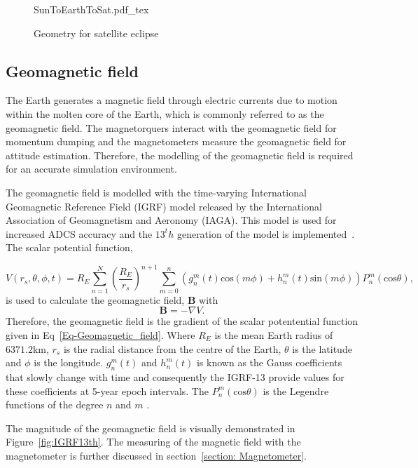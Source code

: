 \begin{figure}[!htb]
	\centering
	\def\svgwidth{12cm}
	{SunToEarthToSat.pdf_tex}
	\caption{Geometry for satellite eclipse}
	\label{fig:SunToEarthToSat}
\end{figure}


\subsection{Geomagnetic field}

The Earth generates a magnetic field through electric currents due to motion within the molten core of the Earth, which is commonly referred to as the geomagnetic field. The magnetorquers interact with the geomagnetic field for momentum dumping and the magnetometers measure the geomagnetic field for attitude estimation. Therefore, the modelling of the geomagnetic field is required for an accurate simulation environment.

The geomagnetic field is modelled with the time-varying International Geomagnetic Reference Field (IGRF) model released by the International Association of Geomagnetism and Aeronomy (IAGA). This model is used for increased ADCS accuracy and the $13^th$ generation of the model is implemented~\cite{alken2021international}. The scalar potential function,

\begin{equation}
\label{Eq-Geomagnetic_field}
V(r_s,\theta, \phi, t) = R_E \sum_{n=1}^{N}\left(\frac{R_E}{r_s}\right)^{n+1}\sum_{m=0}^{n}\left(g_n^m(t)\text{cos}(m\phi) + h_n^m(t)\text{sin}(m\phi)\right)P_n^m(\text{cos}\theta),
\end{equation}
is used to calculate the geomagnetic field, $\mathbf{B}$ with
\begin{equation}
\label{Eq-Geomagnetic_field_strength}
\mathbf{B} = - \nabla V.
\end{equation}
Therefore, the geomagnetic field is the gradient of the scalar potentential function given in Eq~\ref{Eq-Geomagnetic_field}. Where $R_E$ is the mean Earth radius of $\num{6371.2}$km, $r_s$ is the radial distance from the centre of the Earth, $\theta$ is the latitude and $\phi$ is the longitude. $g_n^m(t)$ and $h_n^m(t)$ is known as the Gauss coefficients that slowly change with time and consequently the IGRF-13 provide values for these coefficients at 5-year epoch intervals. The $P_n^m(\text{cos}\theta)$ is the Legendre functions of the degree $n$ and $m$ \cite{winch2005geomagnetism}.

The magnitude of the geomagnetic field is visually demonstrated in Figure~\ref{fig:IGRF13th}. The measuring of the magnetic field with the magnetometer is further discussed in section~\ref{section: Magnetometer}.

